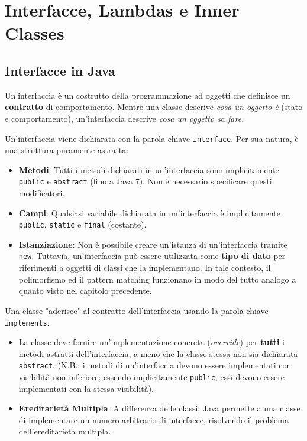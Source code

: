 \chapter{Interfacce, Lambdas e Inner Classes}

\section{Interfacce in Java}

Un'interfaccia è un costrutto della programmazione ad oggetti che definisce un \textbf{contratto} di comportamento. Mentre una classe descrive \textit{cosa un oggetto è} (stato e comportamento), un'interfaccia descrive \textit{cosa un oggetto sa fare}.
\vspace{\baselineskip}

Un'interfaccia viene dichiarata con la parola chiave \texttt{interface}. Per sua natura, è una struttura puramente astratta:

\begin{itemize}
    \item \textbf{Metodi}: Tutti i metodi dichiarati in un'interfaccia sono implicitamente \texttt{public} e \texttt{abstract} (fino a Java 7). Non è necessario specificare questi modificatori.
    \item \textbf{Campi}: Qualsiasi variabile dichiarata in un'interfaccia è implicitamente \texttt{public}, \texttt{static} e \texttt{final} (costante).
    \item \textbf{Istanziazione}: Non è possibile creare un'istanza di un'interfaccia tramite \texttt{new}. Tuttavia, un'interfaccia può essere utilizzata come \textbf{tipo di dato} per riferimenti a oggetti di classi che la implementano. In tale contesto, il polimorfismo ed il pattern matching funzionano in modo del tutto analogo a quanto visto nel capitolo precedente.
\end{itemize}
\vspace{\baselineskip}

Una classe "aderisce" al contratto dell'interfaccia usando la parola chiave \texttt{implements}. 

\begin{itemize}
    \item La classe deve fornire un'implementazione concreta (\textit{override}) per \textbf{tutti} i metodi astratti dell'interfaccia, a meno che la classe stessa non sia dichiarata \texttt{abstract}. (N.B.: i metodi di un'interfaccia devono essere implementati con visibilità non inferiore; essendo implicitamente \texttt{public}, essi devono essere implementati con la stessa visibilità).
    \item \textbf{Ereditarietà Multipla}: A differenza delle classi, Java permette a una classe di implementare un numero arbitrario di interfacce, risolvendo il problema dell'ereditarietà multipla.
\end{itemize}
\vspace{\baselineskip}

